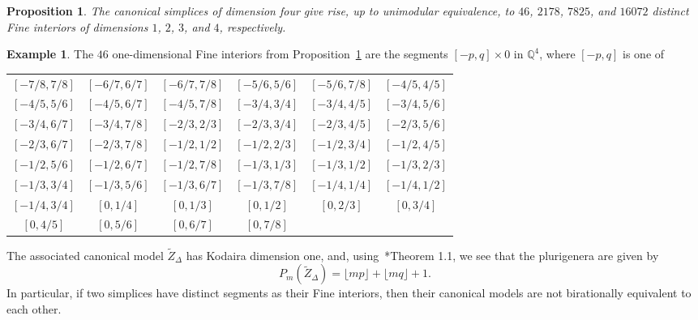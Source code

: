 \documentclass{amsart}
\newcommand{\Q}{\mathbb{Q}}
\theoremstyle{plain}
\newtheorem{proposition}[theorem]{Proposition}
\theoremstyle{definition}
\newtheorem{example}[theorem]{Example}
\begin{document}
\begin{proposition}\label{prop:fine-int}
The canonical simplices of dimension four give rise, up to unimodular equivalence,
to $46$, $2178$, $7825$, and $16072$ distinct Fine interiors of dimensions $1$,
$2$, $3$, and $4$, respectively.
\end{proposition}

\begin{example}
The $46$ one-dimensional Fine interiors from Proposition~\ref{prop:fine-int}
are
the segments $[-p,q] \times 0$ in $\Q^4$, where $[-p,q]$ is one of

\begin{longtable}{cccccc}
$[-7/8, 7/8]$ & $[-6/7, 6/7]$ & $[-6/7, 7/8]$ & $[-5/6, 5/6]$ & $[-5/6, 7/8]$ & $[-4/5, 4/5]$ \\
$[-4/5, 5/6]$ & $[-4/5, 6/7]$ & $[-4/5, 7/8]$ & $[-3/4, 3/4]$ & $[-3/4, 4/5]$ & $[-3/4, 5/6]$ \\
$[-3/4, 6/7]$ & $[-3/4, 7/8]$ & $[-2/3, 2/3]$ & $[-2/3, 3/4]$ & $[-2/3, 4/5]$ & $[-2/3, 5/6]$ \\
$[-2/3, 6/7]$ & $[-2/3, 7/8]$ & $[-1/2, 1/2]$ & $[-1/2, 2/3]$ & $[-1/2, 3/4]$ & $[-1/2, 4/5]$ \\
$[-1/2, 5/6]$ & $[-1/2, 6/7]$ & $[-1/2, 7/8]$ & $[-1/3, 1/3]$ & $[-1/3, 1/2]$ & $[-1/3, 2/3]$ \\
$[-1/3, 3/4]$ & $[-1/3, 5/6]$ & $[-1/3, 6/7]$ & $[-1/3, 7/8]$ & $[-1/4, 1/4]$ & $[-1/4, 1/2]$ \\
$[-1/4, 3/4]$ & $[0, 1/4]$ & $[0, 1/3]$ & $[0, 1/2]$ & $[0, 2/3]$ & $[0, 3/4]$ \\
$[0, 4/5]$ & $[0, 5/6]$ & $[0, 6/7]$ & $[0, 7/8]$ & & \\
\end{longtable}
The associated canonical model $\widetilde Z_\Delta$ has Kodaira dimension one, and,
using~\cite{Gie}*{Theorem 1.1}, we see that the plurigenera are given by 
$$
P_m(\widetilde Z_\Delta)=\lfloor mp\rfloor+\lfloor mq\rfloor+1.
$$
In particular, if two simplices have distinct segments as their Fine interiors,
then their canonical models are not birationally equivalent to each other.
\end{example}
\end{document}
